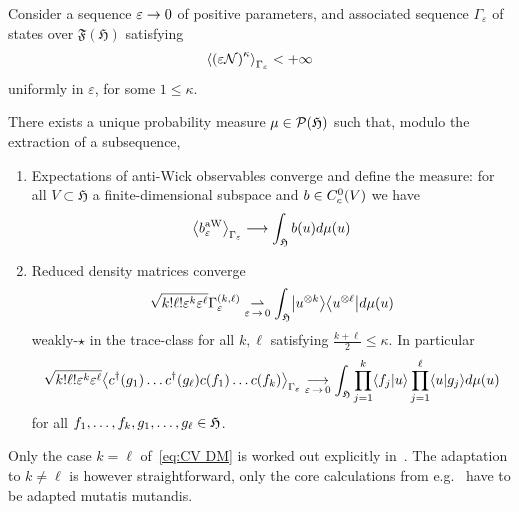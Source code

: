 \documentclass[AHL,Unicode,longabstracts,published]{cedram}
\newcommand{\wto}{\rightharpoonup}
\newcommand{\cN}{\mathcal{N}}
\newcommand{\gH}{\mathfrak{H}}
\newcommand{\gF}{\mathfrak{F}}
\newcommand{\cP}{\mathcal{P}}
\newcommand{\1}{\mathds{1}}
\newcommand{\eps}{\varepsilon}
\newcommand{\cda}{c^{\dagger}}
\let\oldin\in
\renewcommand{\in}{\mathchoice{\oldin}{\oldin}{\,\oldin\,}{\,\oldin\,}}
\renewcommand*{\to}{\mathchoice{\longrightarrow}{\rightarrow}{\rightarrow}{\rightarrow}}
\let\originalleft\left
\let\originalright\right
\renewcommand{\left}{\mathopen{}\mathclose\bgroup\originalleft}
\renewcommand{\right}{\aftergroup\egroup\originalright}
\begin{document}
\begin{theo}\label{thm:deF}
Consider a sequence $\eps \to 0$ of positive parameters, and associated sequence $\Gamma_\eps$ of states over $\gF(\gH)$ satisfying
\begin{equation*}
\left\langle \left(\eps \cN \right)^\kappa \right\rangle_{\Gamma_{\eps}} < + \infty
\end{equation*}
uniformly in $\eps$, for some $1 \leq \kappa$.

There exists a unique probability measure $\mu \in \cP (\gH)$ such that, modulo the extraction of a subsequence,
\begin{enumerate}
\item\label{theo4.5.1} Expectations of anti-Wick observables converge and define the measure: for all $V \subset \gH$ a finite-dimensional subspace and $b\in C^0_c (V)$ we have
\begin{equation}\label{eq:AW CV}
\left\langle b^{\rm aW}_{\eps} \right\rangle_{\Gamma_\eps} \to \int_{ \gH} b(u) d\mu (u)
\end{equation}
\item\label{theo4.5.2} Reduced density matrices converge
\begin{equation}\label{eq:CV DM}
\sqrt{k! \ell ! \eps ^k \eps^\ell}\Gamma_\eps ^{(k,\ell)} \underset{\eps\,\to\,0}{\wto} \int_{\gH} \left|u^{\otimes k} \right\rangle \left\langle u ^{\otimes \ell}\right| d\mu (u)
\end{equation}
weakly-$\star$ in the trace-class for all $k,\ell$ satisfying $\frac{k+\ell}{2} \leq \kappa$. In particular
\begin{equation*}
\sqrt{k! \ell ! \eps ^k \eps^\ell}\left\langle \cda (g_1) \ldots \cda (g_\ell) c (f_1) \ldots c(f_k) \right\rangle_{\Gamma_{\eps}} \underset{\eps\,\to\,0}{\to} \int_{\gH} \prod_{j=1} ^k \langle f_j | u \rangle \prod_{j=1}^\ell \langle u | g_j \rangle d\mu (u)
\end{equation*}
for all $f_1,\ldots,f_k,g_1,\ldots,g_\ell \in \gH$.
\end{enumerate}
\end{theo}

Only the case $k=\ell$ of~\eqref{eq:CV DM} is worked out explicitly in~\cite{LewNamRou-14d}. The adaptation to $k\neq \ell$ is however straightforward, only the core calculations from e.g.~\cite[Lemma~4.2]{LewNamRou-14b} have to be adapted mutatis mutandis.
\end{document}
